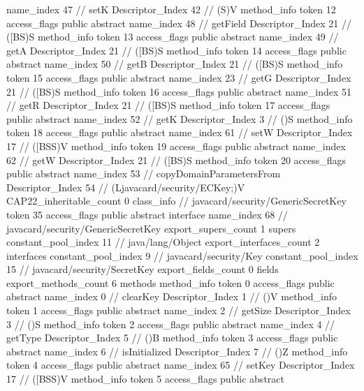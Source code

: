 {{{{{					name_index	47		// setK
					Descriptor_Index	42		// (S)V
				}
				method_info {
					token	12
					access_flags	public abstract
					name_index	48		// getField
					Descriptor_Index	21		// ([BS)S
				}
				method_info {
					token	13
					access_flags	public abstract
					name_index	49		// getA
					Descriptor_Index	21		// ([BS)S
				}
				method_info {
					token	14
					access_flags	public abstract
					name_index	50		// getB
					Descriptor_Index	21		// ([BS)S
				}
				method_info {
					token	15
					access_flags	public abstract
					name_index	23		// getG
					Descriptor_Index	21		// ([BS)S
				}
				method_info {
					token	16
					access_flags	public abstract
					name_index	51		// getR
					Descriptor_Index	21		// ([BS)S
				}
				method_info {
					token	17
					access_flags	public abstract
					name_index	52		// getK
					Descriptor_Index	3		// ()S
				}
				method_info {
					token	18
					access_flags	public abstract
					name_index	61		// setW
					Descriptor_Index	17		// ([BSS)V
				}
				method_info {
					token	19
					access_flags	public abstract
					name_index	62		// getW
					Descriptor_Index	21		// ([BS)S
				}
				method_info {
					token	20
					access_flags	public abstract
					name_index	53		// copyDomainParametersFrom
					Descriptor_Index	54		// (Ljavacard/security/ECKey;)V
				}
			}
			CAP22_inheritable_count	0
		}
		class_info {		// javacard/security/GenericSecretKey
			token	35
			access_flags	public abstract interface
			name_index	68		// javacard/security/GenericSecretKey
			export_supers_count	1
			supers {
				constant_pool_index	11		// java/lang/Object
			}
			export_interfaces_count	2
			interfaces {
				constant_pool_index	9		// javacard/security/Key
				constant_pool_index	15		// javacard/security/SecretKey
			}
			export_fields_count	0
			fields {
			}
			export_methods_count	6
			methods {
				method_info {
					token	0
					access_flags	public abstract
					name_index	0		// clearKey
					Descriptor_Index	1		// ()V
				}
				method_info {
					token	1
					access_flags	public abstract
					name_index	2		// getSize
					Descriptor_Index	3		// ()S
				}
				method_info {
					token	2
					access_flags	public abstract
					name_index	4		// getType
					Descriptor_Index	5		// ()B
				}
				method_info {
					token	3
					access_flags	public abstract
					name_index	6		// isInitialized
					Descriptor_Index	7		// ()Z
				}
				method_info {
					token	4
					access_flags	public abstract
					name_index	65		// setKey
					Descriptor_Index	17		// ([BSS)V
				}
				method_info {
					token	5
					access_flags	public abstract
}}}}}
